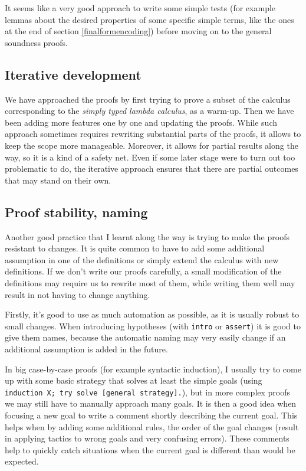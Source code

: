 \documentclass[runningheads]{article}
\begin{document}
It seems like a very good approach to write some simple tests (for example lemmas about the desired properties of some specific simple terms, like the ones at the end of section \ref{finalformencoding}) before moving on to the general soundness proofs.

\subsection{Iterative development}
We have approached the proofs by first trying to prove a subset of the calculus corresponding to the \textit{simply typed lambda calculus}, as a warm-up. Then we have been adding more features one by one and updating the proofs. While such approach sometimes requires rewriting substantial parts of the proofs, it allows to keep the scope more manageable. Moreover, it allows for partial results along the way, so it is a kind of a safety net. Even if some later stage were to turn out too problematic to do, the iterative approach ensures that there are partial outcomes that may stand on their own.

\subsection{Proof stability, naming}

Another good practice that I learnt along the way is trying to make the proofs resistant to changes. It is quite common to have to add some additional assumption in one of the definitions or simply extend the calculus with new definitions. If we don't write our proofs carefully, a small modification of the definitions may require us to rewrite most of them, while writing them well may result in not having to change anything.

Firstly, it's good to use as much automation as possible, as it is usually robust to small changes. When introducing hypotheses (with \verb|intro| or \verb|assert|) it is good to give them names, because the automatic naming may very easily change if an additional assumption is added in the future.

In big case-by-case proofs (for example syntactic induction), I usually try to come up with some basic strategy that solves at least the simple goals (using \verb|induction X; try solve [general strategy].|), but in more complex proofs we may still have to manually approach many goals. It is then a good idea when focusing a new goal to write a comment shortly describing the current goal. This helps when by adding some additional rules, the order of the goal changes (result in applying tactics to wrong goals and very confusing errors). These comments help to quickly catch situations when the current goal is different than would be expected.
\end{document}
